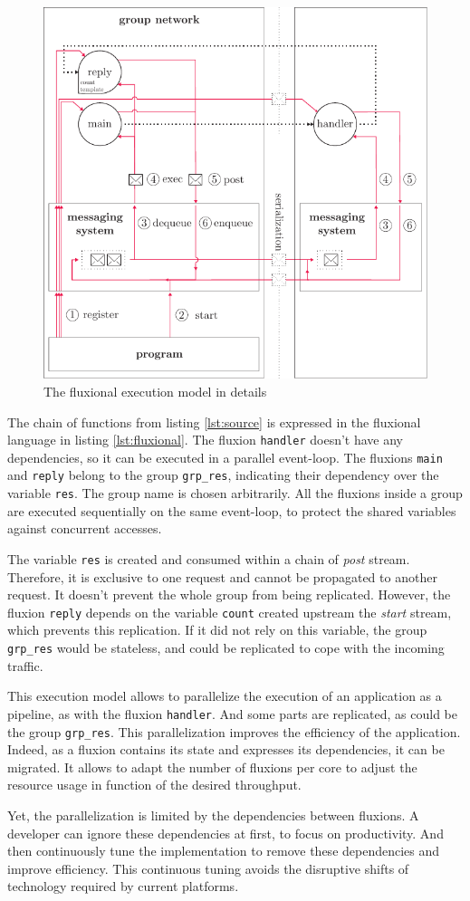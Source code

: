 \begin{figure}[h!]
  \centering
  \includegraphics[width=0.7\linewidth]{../resources/schema-message.pdf}
  \caption{The fluxional execution model in details}
  \label{fig:MesSys}
\end{figure}

The chain of functions from listing \ref{lst:source} is expressed in the fluxional language in listing \ref{lst:fluxional}.
The fluxion \texttt{handler} doesn't have any dependencies, so it can be executed in a parallel event-loop.
The fluxions \texttt{main} and \texttt{reply} belong to the group \texttt{grp\_res}, indicating their dependency over the variable \texttt{res}.
The group name is chosen arbitrarily.
All the fluxions inside a group are executed sequentially on the same event-loop, to protect the shared variables against concurrent accesses.

The variable \texttt{res} is created and consumed within a chain of \textit{post} stream.
Therefore, it is exclusive to one request and cannot be propagated to another request.
It doesn't prevent the whole group from being replicated.
However, the fluxion \texttt{reply} depends on the variable \texttt{count} created upstream the \textit{start} stream, which prevents this replication.
If it did not rely on this variable, the group \texttt{grp\_res} would be stateless, and could be replicated to cope with the incoming traffic.

\separator

This execution model allows to parallelize the execution of an application as a pipeline, as with the fluxion \texttt{handler}.
And some parts are replicated, as could be the group \texttt{grp\_res}.
This parallelization improves the efficiency of the application.
Indeed, as a fluxion contains its state and expresses its dependencies, it can be migrated.
It allows to adapt the number of fluxions per core to adjust the resource usage in function of the desired throughput.

Yet, the parallelization is limited by the dependencies between fluxions.
A developer can ignore these dependencies at first, to focus on productivity.
And then continuously tune the implementation to remove these dependencies and improve efficiency.
This continuous tuning avoids the disruptive shifts of technology required by current platforms.
